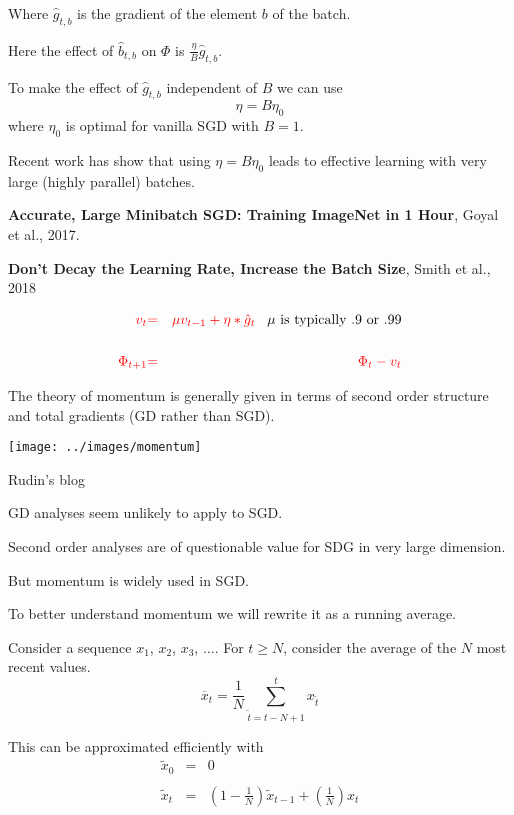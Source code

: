 {\vfill
Where $\hat{g}_{t,b}$ is the gradient of the element $b$ of the batch.

\vfill
Here the effect of $\hat{b}_{t,b}$ on $\Phi$ is $\frac{\eta}{B}\hat{g}_{t,b}$.

\vfill
To make the effect of $\hat{g}_{t,b}$ independent of $B$ we can use
{\color{red} $$\eta = B\eta_0$$}
where $\eta_0$ is optimal for vanilla SGD with $B = 1$.


Recent work has show that using $\eta = B\eta_0$ leads to effective learning with very large (highly parallel)
batches.

\vfill
{\bf Accurate, Large Minibatch SGD: Training ImageNet in 1 Hour}, Goyal et al., 2017.

\vfill
{\bf Don't Decay the Learning Rate, Increase the Batch Size}, Smith et al., 2018


\begin{eqnarray*}
  {\color{red} v_t} & {\color{red} =} & {\color{red} \mu v_{t-1} + \eta * \hat{g}_t} \;\;\;\mbox{$\mu$ is typically .9 or .99}\\
  \\
  {\color{red} \Phi_{t+1}} & {\color{red} =} & {\color{red} \Phi_t -  v_t} \\
\end{eqnarray*}

The theory of momentum is generally given in terms of second order structure and total gradients (GD rather than SGD).


\centerline{\texttt{[image: ../images/momentum]}}
\centerline{\Large Rudin's blog}



GD analyses seem unlikely to apply to SGD.

\vfill
Second order analyses are of questionable value for SDG in very large dimension.

\vfill
But momentum is widely used in SGD.

\vfill
To better understand momentum we will rewrite it as a running average.

Consider a sequence $x_1$, $x_2$, $x_3$, $\ldots$.
\vfill
For $t \geq N$, consider the average of the $N$ most recent values.
$$\overline{x}_t = \frac{1}{N} \sum_{\tilde{t} = t-N+1}^t x_{\tilde{t}}$$

\vfill
This can be approximated efficiently with
\begin{eqnarray*}
\tilde{x}_0 & = & 0 \\
\\
\tilde{x}_t & = & \left(1-\frac{1}{N}\right)\tilde{x}_{t-1} + \left(\frac{1}{N}\right)x_t
\end{eqnarray*}

}
